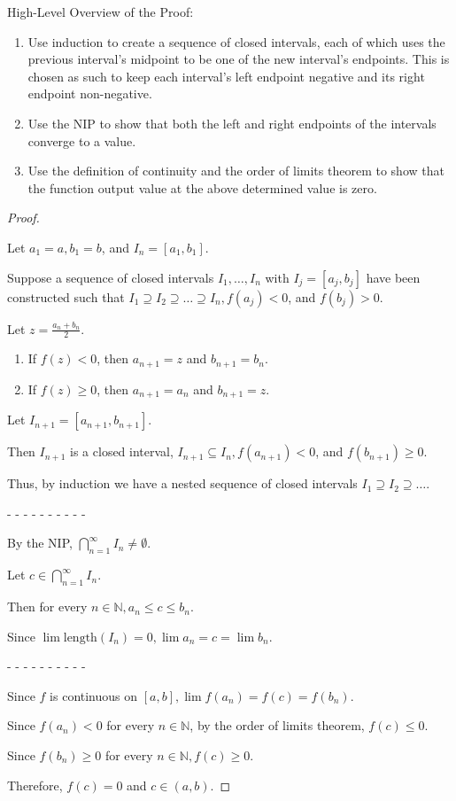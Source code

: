 \documentclass[12pt]{article}
\newcommand{\NN}{\mathbb{N}}
\begin{document}
\dotfill

High-Level Overview of the Proof:

\begin{enumerate}
\item Use induction to create a sequence of closed intervals, each of which uses the previous interval's midpoint to be one of the new interval's endpoints. This is chosen as such to keep each interval's left endpoint negative and its right endpoint non-negative.

\item Use the NIP to show that both the left and right endpoints of the intervals converge to a value.

\item Use the definition of continuity and the order of limits theorem to show that the function output value at the above determined value is zero.
\end{enumerate}

\dotfill

\begin{proof}
$ $

Let $a_1 = a, b_1 = b$, and $I_n = [a_1, b_1]$.

Suppose a sequence of closed intervals $I_1, \dots, I_n$ with $I_j = [a_j, b_j]$ have been constructed such that $I_1 \supseteq I_2 \supseteq \dots \supseteq I_n, f(a_j) < 0$, and $f(b_j) > 0$.

Let $z = \frac{a_n + b_n}{2}$.

\begin{enumerate}
\item If $f(z) < 0$, then $a_{n + 1} = z$ and $b_{n + 1} = b_n$.

\item If $f(z) \ge 0$, then $a_{n + 1} = a_n$ and $b_{n + 1} = z$.
\end{enumerate}

Let $I_{n + 1} = [a_{n + 1}, b_{n + 1}]$.

Then $I_{n + 1}$ is a closed interval, $I_{n + 1} \subseteq I_n, f(a_{n + 1}) < 0$, and $f(b_{n + 1}) \ge 0$.

Thus, by induction we have a nested sequence of closed intervals $I_1 \supseteq I_2 \supseteq \dots$.

- - - - - - - - - -

By the NIP, $\bigcap_{n = 1}^{\infty} I_n \ne \emptyset$.

Let $c \in \bigcap_{n = 1}^{\infty} I_n$.

Then for every $n \in \NN, a_n \le c \le b_n$.

Since $\lim \text{length}(I_n) = 0, \lim a_n = c = \lim b_n$.

- - - - - - - - - -

Since $f$ is continuous on $[a, b], \lim f(a_n) = f(c) = f(b_n)$.

Since $f(a_n) < 0$ for every $n \in \NN$, by the order of limits theorem, $f(c) \le 0$.

Since $f(b_n) \ge 0$ for every $n \in \NN, f(c) \ge 0$.

Therefore, $f(c) = 0$ and $c \in (a, b)$.
\end{proof}
\end{document}
